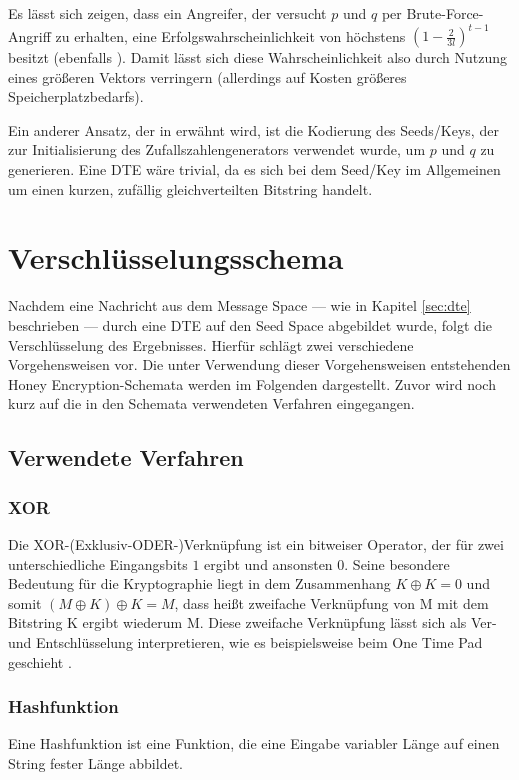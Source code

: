 Es lässt sich zeigen, dass ein Angreifer, der versucht \(p\) und \(q\) per Brute-Force-Angriff zu erhalten, eine Erfolgswahrscheinlichkeit von höchstens \((1-\frac{2}{3l})^{t-1}\) besitzt (ebenfalls \cite{EURO2014}). Damit lässt sich diese Wahrscheinlichkeit also durch Nutzung eines größeren Vektors verringern (allerdings auf Kosten größeres Speicherplatzbedarfs).

Ein anderer Ansatz, der in \cite{EURO2014} erwähnt wird, ist die Kodierung des Seeds/Keys, der zur Initialisierung des Zufallszahlengenerators verwendet wurde, um \(p\) und \(q\) zu generieren. Eine DTE wäre trivial, da es sich bei dem Seed/Key im Allgemeinen um einen kurzen, zufällig gleichverteilten Bitstring handelt.

\section{Verschlüsselungsschema}
\label{sec:schema}

Nachdem eine Nachricht aus dem Message Space --- wie in Kapitel \ref{sec:dte} beschrieben --- durch eine DTE auf den Seed Space abgebildet wurde, folgt die Verschlüsselung des Ergebnisses. Hierfür schlägt \cite{EURO2014} zwei verschiedene Vorgehensweisen vor. Die unter Verwendung dieser Vorgehensweisen entstehenden Honey Encryption-Schemata werden im Folgenden dargestellt. Zuvor wird noch kurz auf die in den Schemata verwendeten Verfahren eingegangen.

\subsection{Verwendete Verfahren}

\subsubsection*{XOR}
Die XOR-(Exklusiv-ODER-)Verknüpfung ist ein bitweiser Operator, der für zwei unterschiedliche Eingangsbits $1$ ergibt und ansonsten $0$. Seine besondere Bedeutung für die Kryptographie liegt in dem Zusammenhang \(K \oplus K = 0\) und somit \((M \oplus K) \oplus K = M\), dass heißt zweifache Verknüpfung von M mit dem Bitstring K ergibt wiederum M. Diese zweifache Verknüpfung lässt sich als Ver- und Entschlüsselung interpretieren, wie es beispielsweise beim One Time Pad geschieht \cite{Schneier2006}.%

\subsubsection*{Hashfunktion}
Eine Hashfunktion ist eine Funktion, die eine Eingabe variabler Länge auf einen String fester Länge abbildet.

